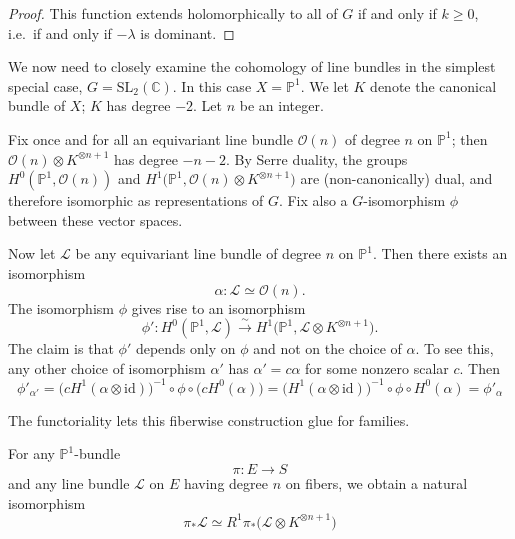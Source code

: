 \documentclass[12pt]{article}
\begin{document}
\begin{proof}
This function extends holomorphically to all of $G$ if and only if $k \ge 0$, i.e.\ if and only if $-\lambda$ is dominant.
\end{proof}
We now need to closely examine the cohomology of line bundles in the simplest special case, \(G=\mathrm{SL}_2(\mathbb{C})\).
In this case \(X=\mathbb{P}^1\).
We let \(K\) denote the canonical bundle of \(X\); \(K\) has degree \(-2\).
Let \(n\) be an integer.

Fix once and for all an equivariant line bundle \(\mathcal{O}(n)\) of degree \(n\) on \(\mathbb{P}^1\); then $\mathcal{O}(n)\otimes K^{\otimes n+1}$
has degree \(-n-2\).
By Serre duality, the groups
$H^0(\mathbb{P}^1,\mathcal{O}(n))$ and 
$H^1\bigl(\mathbb{P}^1,\mathcal{O}(n)\otimes K^{\otimes n+1}\bigr)$
are (non-canonically) dual, and therefore isomorphic as representations of \(G\).
Fix also a \(G\)-isomorphism \(\phi\) between these vector spaces.

Now let \(\mathcal{L}\) be any equivariant line bundle of degree \(n\) on \(\mathbb{P}^1\).
Then there exists an isomorphism
\[
\alpha: \mathcal{L}\simeq \mathcal{O}(n).
\]
The isomorphism \(\phi\) gives rise to an isomorphism
\[
\phi' \colon H^0(\mathbb{P}^1,\mathcal{L})
\xrightarrow{\sim}
H^1\bigl(\mathbb{P}^1,\mathcal{L}\otimes K^{\otimes n+1}\bigr).
\] The claim is that $\phi'$ depends only on $\phi$ and not on the choice of $\alpha$. To see this, any other choice of isomorphism $\alpha'$ has $\alpha' = c\alpha$ for some nonzero scalar $c$. Then \[\phi'_{\alpha'}
=
\bigl(cH^1(\alpha\otimes \mathrm{id})\bigr)^{-1}\circ \phi \circ \bigl(cH^0(\alpha)\bigr)
=
\bigl(H^1(\alpha\otimes \mathrm{id})\bigr)^{-1}\circ \phi \circ H^0(\alpha)
=
\phi'_\alpha\]


The functoriality lets this fiberwise construction glue for families. \begin{proposition}
    For any \(\mathbb{P}^1\)-bundle
\[
\pi \colon E \to S
\]
and any line bundle \(\mathcal{L}\) on \(E\) having degree \(n\) on fibers, we obtain a natural isomorphism
\[
\pi_*\mathcal{L}
\simeq
R^1\pi_*\bigl(\mathcal{L}\otimes K^{\otimes n+1}\bigr)
\]
\end{proposition}
\end{document}
